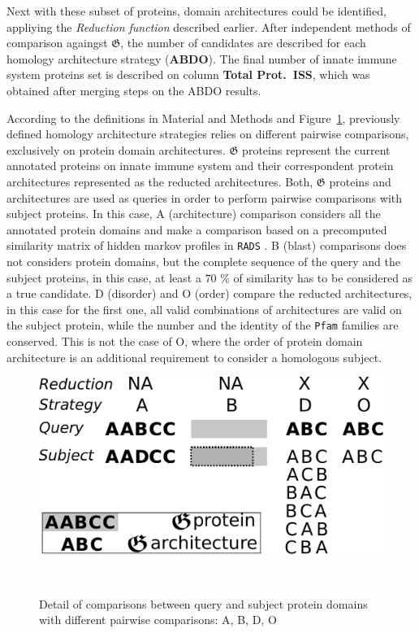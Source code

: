 \documentclass[11pt]{article}
\newcommand{\TODO}[1]{\begingroup\color{red}#1\endgroup}
\begin{document}
Next with these subset of proteins, domain architectures could be identified, appliying 
the \textsl{Reduction function} described earlier. After independent methods of comparison 
againgst $\boldsymbol{\mathfrak{G}}$, the number of candidates are described for 
each homology architecture strategy (\textbf{ABDO}). The final number of innate 
immune system proteins set is described on column \textbf{Total Prot.\ ISS}, which was 
obtained after merging steps on the ABDO results.

According to the definitions in Material and Methods and Figure~\ref{fig:ABDO}, 
previously defined homology architecture strategies relies on different pairwise 
comparisons, exclusively on protein domain architectures. $\boldsymbol{\mathfrak{G}}$
proteins represent the current annotated proteins on innate immune system and 
their correspondent protein architectures represented as the reducted architectures.
Both, $\boldsymbol{\mathfrak{G}}$ proteins and architectures are used as queries 
in order to perform pairwise comparisons with subject proteins. In this case, 
A (architecture) comparison considers all the annotated protein domains and make a 
comparison based on a precomputed similarity matrix of \TODO{hidden markov profiles} 
in \texttt{RADS} \cite{Terrapon:2014}. B (blast) comparisons does not considers protein 
domains, but the complete sequence of the query and the subject proteins, in this case, 
at least a $70$ \% of similarity has to be considered as a true candidate. D (disorder) 
and O (order) compare the reducted architectures, in this case for the first one, 
all valid combinations of architectures are valid on the subject protein, while the 
number and the identity of the \texttt{Pfam} families are conserved. This is not the case 
of O, where the order of protein domain architecture is an additional requirement to 
consider a homologous subject. 

\begin{figure}[ht!]
\centering
\includegraphics[scale=0.3]{figures/ABDO}%
\caption{Detail of comparisons between query and subject protein domains with 
	different pairwise comparisons: A, B, D, O}
~\label{fig:ABDO}
\end{figure}
\end{document}

